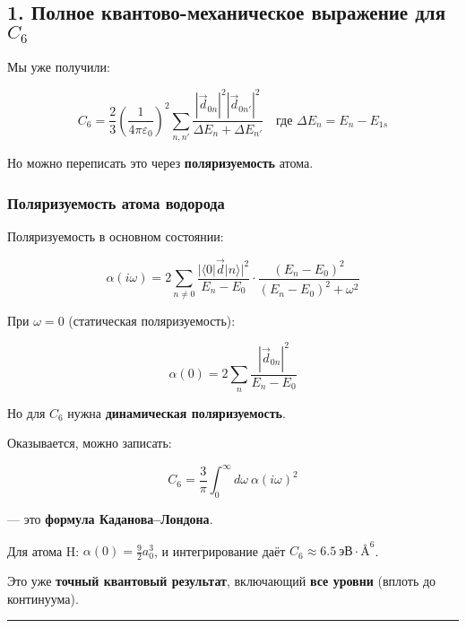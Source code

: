 \documentclass[11pt]{article}
\begin{document}
\subsection{\texorpdfstring{1. Полное квантово-механическое выражение
для
\(C_6\)}{1. Полное квантово-механическое выражение для C\_6}}\label{ux43fux43eux43bux43dux43eux435-ux43aux432ux430ux43dux442ux43eux432ux43e-ux43cux435ux445ux430ux43dux438ux447ux435ux441ux43aux43eux435-ux432ux44bux440ux430ux436ux435ux43dux438ux435-ux434ux43bux44f-c_6}

Мы уже получили:

\[
C_6 = \frac{2}{3} \left( \frac{1}{4\pi\varepsilon_0} \right)^2 \sum_{n,n'} \frac{ |\vec{d}_{0n}|^2 |\vec{d}_{0n'}|^2 }{ \Delta E_n + \Delta E_{n'} }
\quad \text{где } \Delta E_n = E_n - E_{1s}
\]

Но можно переписать это через \textbf{поляризуемость} атома.

\subsubsection{Поляризуемость атома
водорода}\label{ux43fux43eux43bux44fux440ux438ux437ux443ux435ux43cux43eux441ux442ux44c-ux430ux442ux43eux43cux430-ux432ux43eux434ux43eux440ux43eux434ux430}

Поляризуемость в основном состоянии:

\[
\alpha(i\omega) = 2 \sum_{n \neq 0} \frac{ |\langle 0| \vec{d} |n \rangle|^2 }{ E_n - E_0 } \cdot \frac{ (E_n - E_0)^2 }{ (E_n - E_0)^2 + \omega^2 }
\]

При \(\omega = 0\) (статическая поляризуемость):

\[
\alpha(0) = 2 \sum_n \frac{ |\vec{d}_{0n}|^2 }{ E_n - E_0 }
\]

Но для \(C_6\) нужна \textbf{динамическая поляризуемость}.

Оказывается, можно записать:

\[
C_6 = \frac{3}{\pi} \int_0^\infty d\omega\ \alpha(i\omega)^2
\]

--- это \textbf{формула Каданова--Лондона}.

Для атома H: \(\alpha(0) = \frac{9}{2} a_0^3\), и интегрирование даёт
\(C_6 \approx 6.5~\text{эВ}·\text{Å}^6\).

Это уже \textbf{точный квантовый результат}, включающий \textbf{все
уровни} (вплоть до континуума).

\begin{center}\rule{0.5\linewidth}{\linethickness}\end{center}
\end{document}
